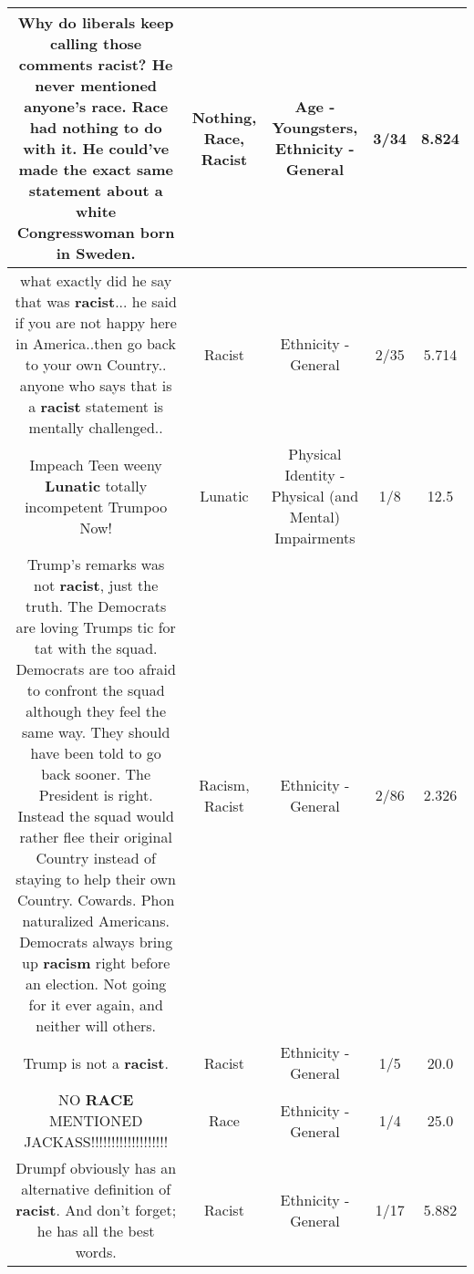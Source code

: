 \documentclass[11pt]{article}
\newlength\mylength
\begin{document}
\begin{center}
\begin{longtable}{|C{.65\mylength}|C{.30\mylength}|C{.12\mylength}|C{.12\mylength}|C{.12\mylength}|}
  \small Why do liberals keep calling those comments \textbf{racist}? He never mentioned anyone's \textbf{race}. \textbf{Race} had \textbf{nothing} to do with it. He could've made the exact same statement about a white Congresswoman born in Sweden.\normalsize   & Nothing, Race, Racist & Age - Youngsters, Ethnicity - General & 3/34 & 8.824 \\  \hline
  \small what exactly did he say that was \textbf{racist}... he said if you are not happy here in America..then go back to your own Country.. anyone who says that is a \textbf{racist} statement is mentally challenged..\normalsize   & Racist & Ethnicity - General & 2/35 & 5.714 \\  \hline
  \small Impeach Teen weeny \textbf{Lunatic}  totally incompetent Trumpoo Now!\normalsize   & Lunatic & Physical Identity - Physical (and Mental) Impairments & 1/8 & 12.5 \\  \hline
  \small Trump's remarks was not \textbf{racist}, just the truth. The Democrats are loving Trumps tic for tat with the squad. Democrats are  too afraid to confront the squad although they feel the same way. They should  have been told to go back sooner. The President is right. Instead the squad would rather flee their original Country instead of staying to  help their own Country. Cowards. Phon naturalized Americans. Democrats always bring up \textbf{racism} right before an election. Not going for it ever again, and neither will others.\normalsize   & Racism, Racist & Ethnicity - General & 2/86 & 2.326 \\  \hline
  \small Trump is not a \textbf{racist}.\normalsize   & Racist & Ethnicity - General & 1/5 & 20.0 \\  \hline
  \small NO \textbf{RACE} MENTIONED JACKASS!!!!!!!!!!!!!!!!!!!\normalsize   & Race & Ethnicity - General & 1/4 & 25.0 \\  \hline
  \small Drumpf obviously has an alternative definition of \textbf{racist}.  And don't forget; he has all the best words.\normalsize   & Racist & Ethnicity - General & 1/17 & 5.882 \\  \hline

\end{longtable}
\end{center}
\end{document}
